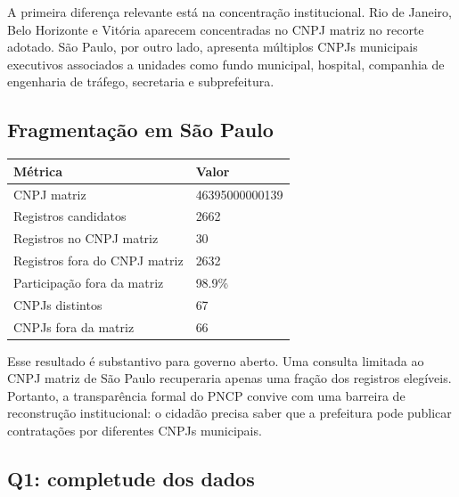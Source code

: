 \documentclass[12pt]{article}
\newcounter{none}
\begin{document}
A primeira diferença relevante está na concentração institucional. Rio
de Janeiro, Belo Horizonte e Vitória aparecem concentradas no CNPJ
matriz no recorte adotado. São Paulo, por outro lado, apresenta
múltiplos CNPJs municipais executivos associados a unidades como fundo
municipal, hospital, companhia de engenharia de tráfego, secretaria e
subprefeitura.

\subsection{Fragmentação em São
Paulo}\label{fragmentauxe7uxe3o-em-suxe3o-paulo}

{\def\LTcaptype{none} %
\begin{longtable}[]{@{}ll@{}}
\toprule\noalign{}
Métrica & Valor \\
\midrule\noalign{}
\endhead
\bottomrule\noalign{}
\endlastfoot
CNPJ matriz & 46395000000139 \\
Registros candidatos & 2662 \\
Registros no CNPJ matriz & 30 \\
Registros fora do CNPJ matriz & 2632 \\
Participação fora da matriz & 98.9\% \\
CNPJs distintos & 67 \\
CNPJs fora da matriz & 66 \\
\end{longtable}
}

Esse resultado é substantivo para governo aberto. Uma consulta limitada
ao CNPJ matriz de São Paulo recuperaria apenas uma fração dos registros
elegíveis. Portanto, a transparência formal do PNCP convive com uma
barreira de reconstrução institucional: o cidadão precisa saber que a
prefeitura pode publicar contratações por diferentes CNPJs municipais.

\subsection{Q1: completude dos dados}\label{q1-completude-dos-dados}
\end{document}
